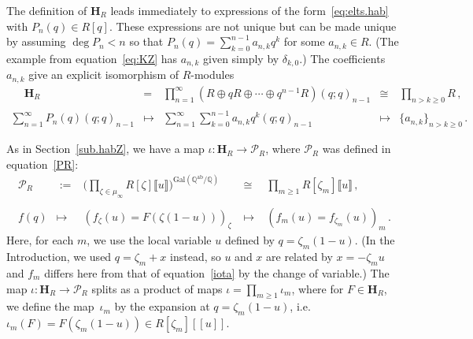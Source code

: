 \documentclass[12pt,reqno]{amsart}
\theoremstyle{definition}
\def\BQ{\mathbb Q}
\def\calP{\mathcal P}
\def\HH{\mathbf H}
\def\be{\begin{equation}}
\def\ee{\end{equation}}
\def\z{\zeta}
\def\={\;=\;}
\begin{document}
The definition of $\HH_R$ leads immediately to
expressions of the form~\eqref{eq:elts.hab} with $P_n(q)\in R[q]$.
These expressions are not unique but can be made unique by assuming
$\deg P_{n}<n$ so that $P_{n}(q)=\sum_{k=0}^{n-1}a_{n,k}q^k$ for some
$a_{n,k}\in R$.
(The example from equation~\eqref{eq:KZ} has $a_{n,k}$ given simply by $\delta_{k,0}$.)
The coefficients $a_{n,k}$ give an explicit isomorphism of $R$-modules
\be
\label{eq:hdecomp}
\begin{array}{ccccc}
  {}_{\phantom{2_{2_{2_{2_{2_{2}}}}}}}\HH_R\!
  &=&
  \!\prod_{n=1}^{\infty}
  (R\oplus qR\oplus\cdots\oplus q^{n-1}R)(q;q)_{n-1}
  &\cong&
  \prod_{n>k\geq0}R\,,\\
  \sum_{n=1}^{\infty}P_{n}(q)(q;q)_{n-1}\!
  &\mapsto&
  \!\sum_{n=1}^{\infty}\sum_{k=0}^{n-1}a_{n,k}q^k(q;q)_{n-1}
  &\mapsto&
  \{a_{n,k}\}_{n>k\geq0}\,.
\end{array}
\ee

As in Section~\ref{sub.habZ}, we have a map $\iota:\HH_R\to\calP_R$, where
$\calP_R$ was defined in equation~\eqref{PR}:
\be
\begin{array}{ccccc}
\calP_{R}
&\;:=\;&
\Big(\prod_{\z\in\mu_\infty} R[\z]
\llbracket u\rrbracket\Big)^{\mathrm{Gal}(\BQ^{\mathrm{ab}}/\BQ)}
&\;\cong\;&
\prod_{m\geq 1} R[\z_m]\llbracket u\rrbracket\,,\\
& & & &\\
f(q) & \mapsto & (f_\z(u)=F(\z(1-u)))_\z & \;\mapsto\; & (f_m(u)=f_{\z_m}(u))_m\,.
\end{array}
\ee
Here, for each $m$, we use the local variable $u$ defined by $q=\z_m(1-u)$.
(In the Introduction, we used
$q=\z_m+x$ instead, so $u$ and $x$ are related by $x=-\z_mu$
and $f_m$ differs here from that of equation~\ref{iota} by the change of variable.)
The map $\iota:\HH_R\to\calP_R$
splits as a product of maps $\iota=\prod_{m\geq1}\iota_m$, where
for $F\in\HH_R$, we define the map~$\iota_m$ by the expansion at $q=\z_m(1-u)$, i.e.
$\iota_m(F)=F(\z_m(1-u))\in R[\z_m][\![u]\!]$.
\end{document}
